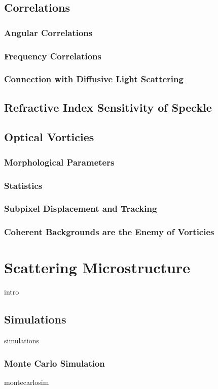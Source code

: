 \documentclass[a4paper,titlepage,onecolumn]{report}
\begin{document}
 \section{Correlations}
  \subsection{Angular Correlations}
  \subsection{Frequency Correlations}
  \subsection{Connection with Diffusive Light Scattering}
 \section{Refractive Index Sensitivity of Speckle}
 \section{Optical Vorticies}
  \subsection{Morphological Parameters}
  \subsection{Statistics}
  \subsection{Subpixel Displacement and Tracking}
  \subsection{Coherent Backgrounds are the Enemy of Vorticies}

\chapter{Scattering Microstructure} \label{ch:scatteringmicro}
{intro}
 \section{Simulations}
	{simulations}
	\subsection{Monte Carlo Simulation} \label{sec:montecarlo}
		{montecarlosim}
\end{document}
